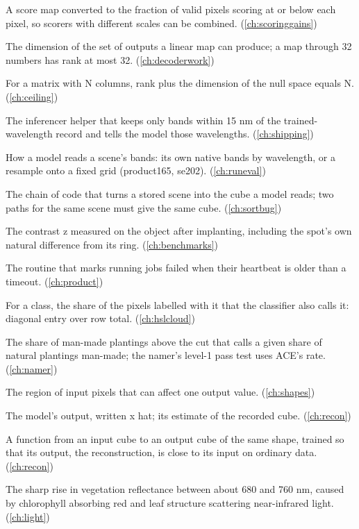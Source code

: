 \begin{description}[style=nextline,leftmargin=1.2em,font=\normalfont\bfseries]
\item[Rank map] A score map converted to the fraction of valid pixels scoring at or below each pixel, so scorers with different scales can be combined. (\cref{ch:scoringgains})
\item[Rank of a matrix] The dimension of the set of outputs a linear map can produce; a map through 32 numbers has rank at most 32. (\cref{ch:decoderwork})
\item[Rank-nullity theorem] For a matrix with N columns, rank plus the dimension of the null space equals N. (\cref{ch:ceiling})
\item[read\_bands] The inferencer helper that keeps only bands within 15 nm of the trained-wavelength record and tells the model those wavelengths. (\cref{ch:shipping})
\item[Reading] How a model reads a scene's bands: its own native bands by wavelength, or a resample onto a fixed grid (product165, se202). (\cref{ch:runeval})
\item[Reading path] The chain of code that turns a stored scene into the cube a model reads; two paths for the same scene must give the same cube. (\cref{ch:sortbug})
\item[Realised contrast] The contrast z measured on the object after implanting, including the spot's own natural difference from its ring. (\cref{ch:benchmarks})
\item[Reaper] The routine that marks running jobs failed when their heartbeat is older than a timeout. (\cref{ch:product})
\item[Recall] For a class, the share of the pixels labelled with it that the classifier also calls it: diagonal entry over row total. (\cref{ch:hslcloud})
\item[Recall at a fixed false-alarm rate] The share of man-made plantings above the cut that calls a given share of natural plantings man-made; the namer's level-1 pass test uses ACE's rate. (\cref{ch:namer})
\item[Receptive field] The region of input pixels that can affect one output value. (\cref{ch:shapes})
\item[Reconstruction] The model's output, written x hat; its estimate of the recorded cube. (\cref{ch:recon})
\item[Reconstruction model] A function from an input cube to an output cube of the same shape, trained so that its output, the reconstruction, is close to its input on ordinary data. (\cref{ch:recon})
\item[Red edge] The sharp rise in vegetation reflectance between about 680 and 760 nm, caused by chlorophyll absorbing red and leaf structure scattering near-infrared light. (\cref{ch:light})

\end{description}

